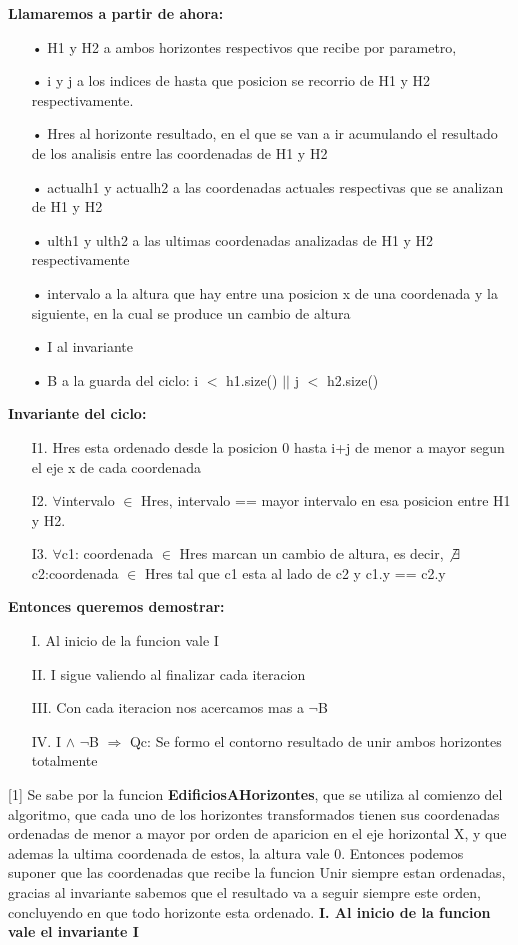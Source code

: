\documentclass[10pt,a4paper]{article}
\begin{document}
\bigskip
\textbf{Llamaremos a partir de ahora:}
\begin{itemize}
\item[•]H1 y H2 a ambos horizontes respectivos que recibe por parametro, 
\item[•]i y j a los indices de hasta que posicion se recorrio de H1 y H2 respectivamente.
\item[•]Hres al horizonte resultado, en el que se van a ir acumulando el resultado de los analisis entre las coordenadas de H1 y H2
\item[•]actualh1 y actualh2 a las coordenadas actuales respectivas que se analizan de H1 y H2
\item[•]ulth1 y ulth2 a las ultimas coordenadas analizadas de H1 y H2 respectivamente
\item[•]intervalo a la altura que hay entre una posicion x de una coordenada y la siguiente, en la cual se produce un cambio de altura
\item[•]I al invariante
\item[•]B a la guarda del ciclo: i $<$ h1.size() $\vert\vert$ j $<$ h2.size()
\end{itemize}
\bigskip
\textbf{Invariante del ciclo:} 
\begin{itemize}
\item[I1.] Hres esta ordenado desde la posicion 0 hasta i+j de menor a mayor segun el eje x de cada coordenada
\item[I2.] $\forall$intervalo $\in$ Hres, intervalo == mayor intervalo en esa posicion entre H1 y H2.
\item[I3.] $\forall$c1: coordenada $\in$ Hres marcan un cambio de altura, es decir, $\not\exists$ c2:coordenada $\in$ Hres tal que c1 esta al lado de c2 y c1.y == c2.y
\end{itemize}
\bigskip
\textbf{Entonces queremos demostrar:}
\begin{itemize}
\item[I.] Al inicio de la funcion vale I
\item[II.] I sigue valiendo al finalizar cada iteracion
\item[III.] Con cada iteracion nos acercamos mas a $\neg$B
\item[IV.] I $\wedge$ $\neg$B $\Rightarrow$ Qc: Se formo el contorno resultado de unir ambos horizontes totalmente
\end{itemize}
\null
\vfill
[1] Se sabe por la funcion \textbf{EdificiosAHorizontes}, que se utiliza al comienzo del algoritmo, que cada uno de los horizontes transformados tienen sus coordenadas ordenadas de menor a mayor por orden de aparicion en el eje horizontal X, y que ademas la ultima coordenada de estos, la altura vale 0. Entonces podemos suponer que las coordenadas que recibe la funcion Unir siempre estan ordenadas, gracias al invariante sabemos que el resultado va a seguir siempre este orden, concluyendo en que todo horizonte esta ordenado.
\newpage
\noindent \textbf{I. Al inicio de la funcion vale el invariante I}
\end{document}
